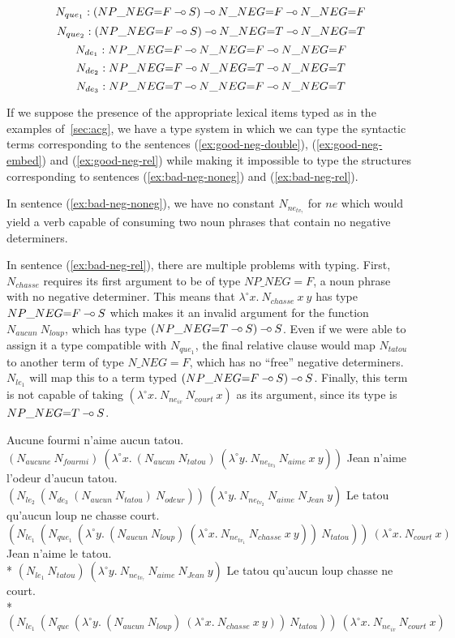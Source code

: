 $$
N_{que_1} : (NP\_NEG{=}F \mathbin{{-}\mkern-3.5mu{\circ}} S) \mathbin{{-}\mkern-3.5mu{\circ}} N\_NEG{=}F \mathbin{{-}\mkern-3.5mu{\circ}} N\_NEG{=}F
$$
$$
N_{que_2} : (NP\_NEG{=}F \mathbin{{-}\mkern-3.5mu{\circ}} S) \mathbin{{-}\mkern-3.5mu{\circ}} N\_NEG{=}T \mathbin{{-}\mkern-3.5mu{\circ}} N\_NEG{=}T
$$
$$
N_{de_1} : NP\_NEG{=}F \mathbin{{-}\mkern-3.5mu{\circ}} N\_NEG{=}F \mathbin{{-}\mkern-3.5mu{\circ}} N\_NEG{=}F
$$
$$
N_{de_2} : NP\_NEG{=}F \mathbin{{-}\mkern-3.5mu{\circ}} N\_NEG{=}T \mathbin{{-}\mkern-3.5mu{\circ}} N\_NEG{=}T
$$
$$
N_{de_3} : NP\_NEG{=}T \mathbin{{-}\mkern-3.5mu{\circ}} N\_NEG{=}F \mathbin{{-}\mkern-3.5mu{\circ}} N\_NEG{=}T
$$

If we suppose the presence of the appropriate lexical items typed as in
the examples of~\ref{sec:acg}, we have a type system in which we can
type the syntactic terms corresponding to the sentences
(\ref{ex:good-neg-double}), (\ref{ex:good-neg-embed}) and
(\ref{ex:good-neg-rel}) while making it impossible to type the
structures corresponding to sentences (\ref{ex:bad-neg-noneg}) and
({\ref{ex:bad-neg-rel}}).

In sentence (\ref{ex:bad-neg-noneg}), we have no constant
$N_{ne_{tv_?}}$ for $ne$ which would yield a verb capable of consuming
two noun phrases that contain no negative determiners.

In sentence (\ref{ex:bad-neg-rel}), there are multiple problems with
typing. First, $N_{chasse}$ requires its first argument to be of type
$NP\_NEG{=}F$, a noun phrase with no negative determiner. This means
that $\lambda^{\circ} x.\ N_{chasse}\ x\ y$ has type $NP\_NEG{=}F \mathbin{{-}\mkern-3.5mu{\circ}}
S$ which makes it an invalid argument for the function
$N_{aucun}\ N_{loup}$, which has type $(NP\_NEG{=}T \mathbin{{-}\mkern-3.5mu{\circ}} S) \mathbin{{-}\mkern-3.5mu{\circ}}
S$. Even if we were able to assign it a type compatible with
$N_{que_1}$, the final relative clause would map $N_{tatou}$ to another
term of type $N\_NEG{=}F$, which has no ``free'' negative
determiners. $N_{le_1}$ will map this to a term typed $(NP\_NEG{=}F
\mathbin{{-}\mkern-3.5mu{\circ}} S) \mathbin{{-}\mkern-3.5mu{\circ}} S$. Finally, this term is not capable of taking
$(\lambda^{\circ} x.\ N_{ne_{iv}}\ N_{court}\ x)$ as its argument, since
its type is $NP\_NEG{=}T \mathbin{{-}\mkern-3.5mu{\circ}} S$.

\begin{exe}
  \ex \label{ex:good-neg-double} Aucune fourmi n'aime aucun tatou. \\
      $(N_{aucune}\ N_{fourmi})\ (\lambda^{\circ} x.\ (N_{aucun}\ N_{tatou})\ (\lambda^{\circ} y.\ N_{ne_{tv_3}}\ N_{aime}\ x\ y))$
  \ex \label{ex:good-neg-embed} Jean n'aime l'odeur d'aucun tatou. \\
      $(N_{le_2}\ (N_{de_3}\ (N_{aucun}\ N_{tatou})\ N_{odeur}))\ (\lambda^{\circ} y.\ N_{ne_{tv_2}}\ N_{aime}\ N_{Jean}\ y)$
  \ex \label{ex:good-neg-rel} Le tatou qu'aucun loup ne chasse court. \\
      $(N_{le_1}\ (N_{que_1}\ (\lambda^{\circ} y.\ (N_{aucun}\ N_{loup})\ (\lambda^{\circ} x.\ N_{ne_{tv_1}}\ N_{chasse}\ x\ y))\ N_{tatou}))\ (\lambda^{\circ} x.\ N_{court}\ x)$
  \ex * \label{ex:bad-neg-noneg} Jean n'aime le tatou. \\
      * $(N_{le_1}\ N_{tatou})\ (\lambda^{\circ} y.\ N_{ne_{tv_?}}\ N_{aime}\ N_{Jean}\ y)$
  \ex * \label{ex:bad-neg-rel} Le tatou qu'aucun loup chasse ne court. \\
      * $(N_{le_1}\ (N_{que}\ (\lambda^{\circ} y.\ (N_{aucun}\ N_{loup})\ (\lambda^{\circ} x.\ N_{chasse}\ x\ y))\ N_{tatou}))\ (\lambda^{\circ} x.\ N_{ne_{iv}}\ N_{court}\ x)$
\end{exe}

